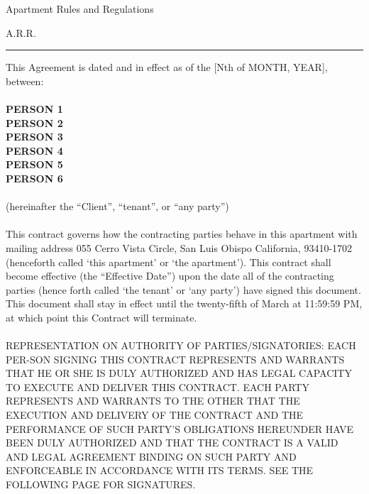 \documentclass[10pt]{article}
\begin{document}
	\begin{center}
		{\Large Apartment Rules and Regulations}
	\end{center}
\begin{center}

	{\normalsize  A.R.R.}
\end{center}
\hrule height .1mm

\vspace{.5cm}

\noindent This Agreement is dated and in effect as of the [Nth of MONTH, YEAR], between:\\
\\
{\bf PERSON 1}\\
{\bf PERSON 2}\\
{\bf PERSON 3}\\
{\bf PERSON 4}\\
{\bf PERSON 5}\\
{\bf PERSON 6}\\
\\(hereinafter the ``Client'', ``tenant'', or ``any party'')\\ \\

This contract governs how the contracting parties behave in this apartment with mailing address 055 Cerro Vista Circle, San Luis Obispo California, 93410-1702 (henceforth called ‘this apartment’ or ‘the apartment’). This contract shall become effective (the “Effective Date”) upon the date all of the contracting parties (hence forth called ‘the tenant’ or ‘any party’) have signed this document. This document shall stay in effect until the twenty-fifth of March at 11:59:59 PM, at which point this Contract will terminate.
\\ \\
\noindent REPRESENTATION ON AUTHORITY OF PARTIES/SIGNATORIES: EACH PER-SON SIGNING THIS CONTRACT REPRESENTS AND WARRANTS THAT HE OR SHE IS DULY AUTHORIZED AND HAS LEGAL CAPACITY TO EXECUTE AND DELIVER THIS CONTRACT. EACH PARTY REPRESENTS AND WARRANTS TO THE OTHER THAT THE EXECUTION AND DELIVERY OF THE CONTRACT AND THE PERFORMANCE OF SUCH PARTY’S OBLIGATIONS HEREUNDER HAVE BEEN DULY AUTHORIZED AND THAT THE CONTRACT IS A VALID AND LEGAL AGREEMENT BINDING ON SUCH PARTY AND ENFORCEABLE IN ACCORDANCE WITH ITS TERMS. SEE THE FOLLOWING PAGE FOR SIGNATURES.

\newpage
\end{document}
